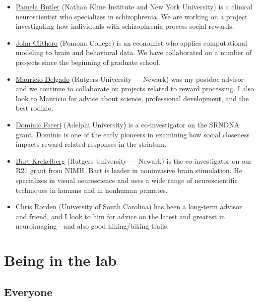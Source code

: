 \documentclass[letterpaper,12pt,oneside]{memoir}
\begin{document}
\begin{itemize}

\item\href{https://www.nki.rfmh.org/faculty/pam-butler-phd}{Pamela Butler} (Nathan Kline Institute and New York University) is a clinical neuroscientist who specializes in schizophrenia. We are working on a project investigating how individuals with schizophrenia process social rewards.
\item\href{https://www.johnclithero.com/}{John Clithero} (Pomona College) is an economist who applies computational modeling to brain and behavioral data. We have collaborated on a number of projects since the beginning of graduate school.
\item\href{https://www.newark.rutgers.edu/mauricio-delgado}{Mauricio Delgado} (Rutgers University --- Newark) was my postdoc advisor and we continue to collaborate on projects related to reward processing. I also look to Mauricio for advice about science, professional development, and the best rodizio.
\item\href{http://www.adelphi.edu/faculty/profiles/profile.php?PID=0655}{Dominic Fareri} (Adelphi University) is a co-investigator on the SRNDNA grant. Dominic is one of the early pioneers in examining how social closeness impacts reward-related responses in the striatum.
\item\href{http://vision.rutgers.edu/Research/Home.aspx}{Bart Krekelberg} (Rutgers University --- Newark) is the co-investigator on our R21 grant from NIMH. Bart is leader in noninvasive brain stimulation. He specializes in visual neuroscience and uses a wide range of neuroscientific techniques in humans and in nonhuman primates.
\item\href{http://www.mccauslandcenter.sc.edu/crnl/chris-rordens-neuropsychology-lab}{Chris Rorden} (University of South Carolina) has been a long-term advisor and friend, and I look to him for advice on the latest and greatest in neuroimaging---and also good hiking/biking trails. 

\end{itemize}



\chapter{Being in the lab}

\section{Everyone}
\end{document}
